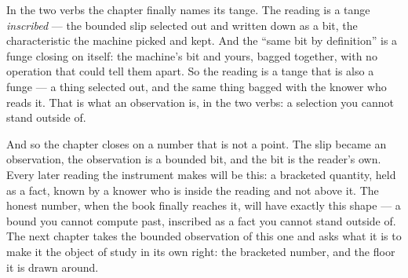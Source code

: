In the two verbs the chapter finally names its tange. The reading is a tange \emph{inscribed} --- the bounded slip
selected out and written down as a bit, the characteristic the machine picked and kept. And the ``same bit by
definition'' is a funge closing on itself: the machine's bit and yours, bagged together, with no operation that could
tell them apart. So the reading is a tange that is also a funge --- a thing selected out, and the same thing bagged
with the knower who reads it. That is what an observation is, in the two verbs: a selection you cannot stand outside of.

And so the chapter closes on a number that is not a point. The slip became an observation, the observation is a bounded
bit, and the bit is the reader's own. Every later reading the instrument makes will be this: a bracketed quantity, held
as a fact, known by a knower who is inside the reading and not above it. The honest number, when the book finally
reaches it, will have exactly this shape --- a bound you cannot compute past, inscribed as a fact you cannot stand
outside of. The next chapter takes the bounded observation of this one and asks what it is to make it the object of
study in its own right: the bracketed number, and the floor it is drawn around.

